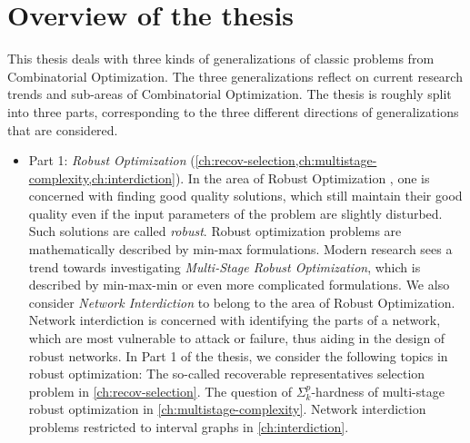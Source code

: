 \section{Overview of the thesis}

This thesis deals with three kinds of generalizations of classic problems from Combinatorial Optimization. 
The three generalizations reflect on current research trends and sub-areas of Combinatorial Optimization. 
The thesis is roughly split into three parts, corresponding to the three different directions of generalizations that are considered.

\begin{itemize}
\item Part 1: \emph{Robust Optimization} (\cref{ch:recov-selection,ch:multistage-complexity,ch:interdiction}). In the area of Robust Optimization \cite{ben2009robust}, one is concerned with finding good quality solutions, 
which still maintain their good quality even if the input parameters of the problem are slightly disturbed. Such solutions are called \emph{robust}.
Robust optimization problems are mathematically described by min-max formulations. Modern research sees a trend towards investigating \emph{Multi-Stage Robust Optimization}, which is described by min-max-min or even more complicated formulations.
 We also consider \emph{Network Interdiction} to belong to the area of Robust Optimization. 
Network interdiction is concerned with identifying the parts of a network, which are most vulnerable to attack or failure, thus aiding in the design of robust networks. 
In Part 1 of the thesis, we consider the following topics in robust optimization: The so-called recoverable representatives selection problem in \cref{ch:recov-selection}. The question of $\Sigma^p_k$-hardness of multi-stage robust optimization in \cref{ch:multistage-complexity}. 
Network interdiction problems restricted to interval graphs in \cref{ch:interdiction}.


\end{itemize}
